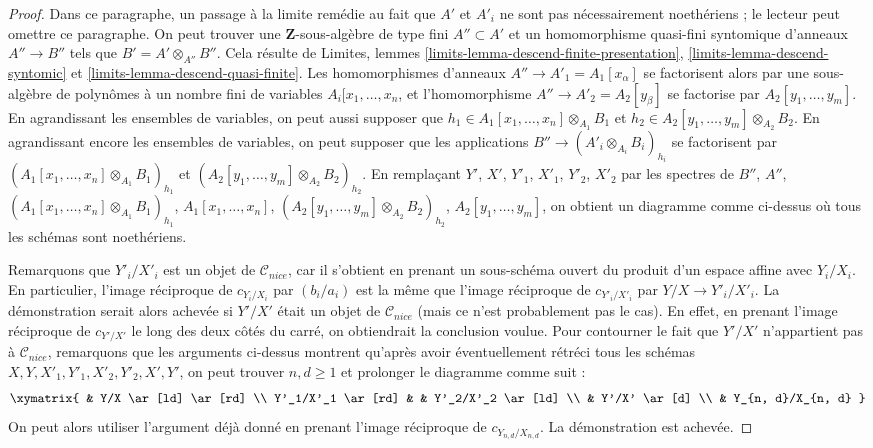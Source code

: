\begin{proof}
\medskip\noindent
Dans ce paragraphe, un passage à la limite remédie au fait que $A'$ et $A'_i$ ne sont pas
nécessairement noethériens ; le lecteur peut omettre ce paragraphe.
On peut trouver une $\mathbf{Z}$-sous-algèbre de type fini
$A'' \subset A'$ et un homomorphisme quasi-fini syntomique d'anneaux
$A'' \to B''$ tels que $B' = A' \otimes_{A''} B''$.
Cela résulte de Limites, lemmes
\ref{limits-lemma-descend-finite-presentation},
\ref{limits-lemma-descend-syntomic} et
\ref{limits-lemma-descend-quasi-finite}.
Les homomorphismes d'anneaux $A'' \to A'_1 = A_1[x_\alpha]$ se factorisent alors par une
sous-algèbre de polynômes à un nombre fini de variables $A_i[x_1, \ldots, x_n$, et l'homomorphisme
$A'' \to A'_2 = A_2[y_\beta]$ se factorise par $A_2[y_1, \ldots, y_m]$.
En agrandissant les ensembles de variables, on peut aussi supposer que
$h_1 \in A_1[x_1, \ldots, x_n] \otimes_{A_1} B_1$ et
$h_2 \in A_2[y_1, \ldots, y_m] \otimes_{A_2} B_2$.
En agrandissant encore les ensembles de variables, on peut supposer
que les applications $B'' \to (A'_i \otimes_{A_i} B_i)_{h_i}$
se factorisent par $(A_1[x_1, \ldots, x_n] \otimes_{A_1} B_1)_{h_1}$
et $(A_2[y_1, \ldots, y_m] \otimes_{A_2} B_2)_{h_2}$.
En remplaçant $Y'$, $X'$, $Y'_1$, $X'_1$, $Y'_2$, $X'_2$ par les spectres de
$B''$, $A''$, $(A_1[x_1, \ldots, x_n] \otimes_{A_1} B_1)_{h_1}$,
$A_1[x_1, \ldots, x_n]$, $(A_2[y_1, \ldots, y_m] \otimes_{A_2} B_2)_{h_2}$,
$A_2[y_1, \ldots, y_m]$, on obtient un diagramme comme ci-dessus
où tous les schémas sont noethériens.

\medskip\noindent
Remarquons que $Y'_i/X'_i$ est un objet de $\mathcal{C}_{nice}$, car il
s'obtient en prenant un sous-schéma ouvert du produit d'un espace affine
avec $Y_i/X_i$. En particulier, l'image réciproque de
$c_{Y_i/X_i}$ par $(b_i/a_i)$ est la même que l'image réciproque de
$c_{Y'_i/X'_i}$ par $Y/X \to Y'_i/X'_i$.
La démonstration serait alors achevée si $Y'/X'$ était un objet de $\mathcal{C}_{nice}$
(mais ce n'est probablement pas le cas). En effet, en prenant l'image réciproque de $c_{Y'/X'}$
le long des deux côtés du carré, on obtiendrait la conclusion voulue.
Pour contourner le fait que $Y'/X'$ n'appartient pas à $\mathcal{C}_{nice}$,
remarquons que les arguments ci-dessus montrent qu'après avoir éventuellement rétréci tous
les schémas $X, Y, X'_1, Y'_1, X'_2, Y'_2, X', Y'$, on peut trouver
$n, d \geq 1$ et prolonger le diagramme comme suit :
$$
\xymatrix{
& Y/X \ar[ld] \ar[rd] \\
Y'_1/X'_1 \ar[rd] & & Y'_2/X'_2 \ar[ld] \\
& Y'/X' \ar[d] \\
& Y_{n, d}/X_{n, d}
}
$$
On peut alors utiliser l'argument déjà donné en prenant
l'image réciproque de $c_{Y_{n, d}/X_{n, d}}$. La démonstration est achevée.
\end{proof}













